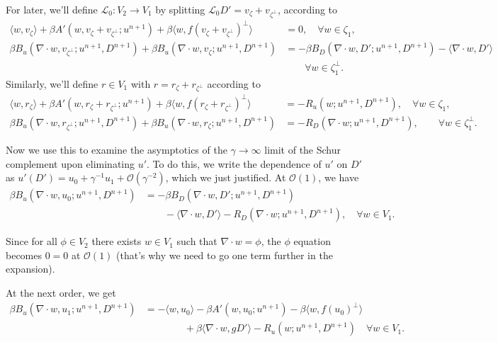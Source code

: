 \documentclass{article}
\begin{document}
For later, we'll define $\mathcal{L}_0:V_2\to V_1$ by splitting
$\mathcal{L}_0D'=v_\zeta + v_{\zeta^\perp}$, according to
\begin{align}
    \langle w, v_\zeta\rangle + \beta A'(w,v_\zeta + v_{\zeta^\perp}; u^{n+1})
  + \beta\langle w, f(v_\zeta + v_{\zeta^\perp})^\perp\rangle &= 0,
  \quad \forall w\in \zeta_1, \\
  \nonumber
   \beta B_u(\nabla\cdot w, v_{\zeta^\perp}; u^{n+1},D^{n+1})  
  + \beta B_u(\nabla\cdot w, v_\zeta; u^{n+1},D^{n+1}) & = 
  - \beta B_D(\nabla\cdot w, D'; u^{n+1},D^{n+1}) -\langle \nabla\cdot w, D' \rangle \\
  & \qquad \forall w \in \zeta_1^\perp.
\end{align}
Similarly, we'll define $r\in V_1$ with $r=r_\zeta + r_{\zeta^\perp}$ according to
\begin{align}
    \langle w, r_\zeta\rangle + \beta A'(w,r_\zeta + r_{\zeta^\perp}; u^{n+1})
  + \beta\langle w, f(r_\zeta + r_{\zeta^\perp})^\perp\rangle &= -R_u(w; u^{n+1},D^{n+1}),
  \quad \forall w\in \zeta_1, \\
   \beta B_u(\nabla\cdot w, r_{\zeta^\perp}; u^{n+1},D^{n+1})  
  + \beta B_u(\nabla\cdot w, r_\zeta; u^{n+1},D^{n+1}) & = 
-R_D(\nabla\cdot w;u^{n+1},D^{n+1}), \qquad \forall w \in \zeta_1^\perp.
\end{align}

Now we use this to examine the asymptotics of the $\gamma\to \infty$
limit of the Schur complement upon eliminating $u'$. To do this, we
write the dependence of $u'$ on $D'$ as $u'(D') =u_0 + \gamma^{-1} u_1
+ \mathcal{O}(\gamma^{-2})$, which we just justified. At
$\mathcal{O}(1)$, we have
\begin{align}
  \nonumber \beta B_u(\nabla\cdot w, u_0; u^{n+1},D^{n+1}) & = - \beta
  B_D(\nabla\cdot w, D'; u^{n+1},D^{n+1}) \\ & \qquad -\langle
  \nabla\cdot w, D' \rangle -R_D(\nabla\cdot w;u^{n+1},D^{n+1}), \quad
  \forall w\in V_1.
\end{align}

Since for all $\phi\in V_2$ there exists $w\in V_1$ such that
$\nabla\cdot w = \phi$, the $\phi$ equation becomes $0=0$ at
$\mathcal{O}(1)$ (that's why we need to go one term further in the
expansion).

At the next order, we get
\begin{align}
  \nonumber
  \beta B_u(\nabla\cdot w, u_1; u^{n+1},D^{n+1})
  & = 
  -\langle w, u_0 \rangle - \beta A'(w, u_0; u^{n+1})
  - \beta\langle w, f(u_0)^{\perp}\rangle \\
  & \qquad\qquad
  + \beta\langle \nabla\cdot w, gD'\rangle
  -R_u(w;u^{n+1},D^{n+1})
  \quad \forall w \in V_1.
\end{align}
\end{document}

